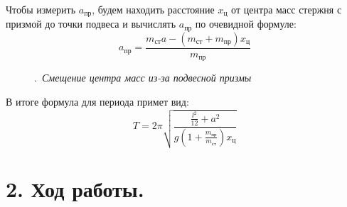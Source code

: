 \documentclass[a4paper]{article}
\begin{document}
\noindent
Чтобы измерить $a_{\text{пр}}$, будем находить расстояние $x_{\text{ц}}$ от центра масс стержня с призмой до точки подвеса и вычислять $a_{\text{пр}}$ по очевидной формуле: 
\begin{equation}
a_{\text{пр}} = \frac{m_{\text{ст}} a - (m_{\text{ст}} + m_{\text{пр}})x_{\text{ц}}}{m_{\text{пр}}}
\end{equation}

\begin{figure}[h]
\caption{.\ \textit{Смещение центра масс из-за подвесной призмы}}
\end{figure}

\noindent
В итоге формула для периода примет вид:
\begin{equation}\label{eq11}
T = 2\pi \sqrt{\frac{\frac{l^2}{12} + a^2}{g (1+\frac{m_{\text{пр}}}{m_{\text{ст}}})x_{\text{ц}}}}
\end{equation}

\section*{\textbf{2. Ход работы.}}
\end{document}
